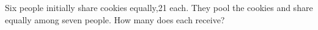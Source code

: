 Six people initially share cookies equally,21 each. They pool the cookies and share equally among seven people. How many does each receive?
